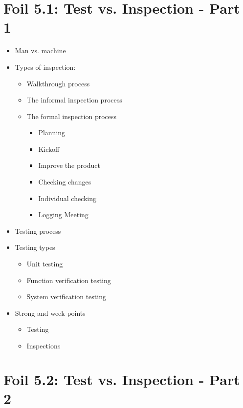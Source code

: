 
	\section{Foil 5.1: Test vs. Inspection - Part 1}

		\begin{itemize}
			\item Man vs. machine
			\item Types of inspection:
				\begin{itemize}
					\item Walkthrough process
					\item The informal inspection process
					\item The formal inspection process
						\begin{itemize}
							\item Planning
							\item Kickoff
							\item Improve the product
							\item Checking changes
							\item Individual checking
							\item Logging Meeting
						\end{itemize}
				\end{itemize}
			\item Testing process
			\item Testing types
				\begin{itemize}
					\item Unit testing
					\item Function verification testing
					\item System verification testing
				\end{itemize}
			\item Strong and week points
			\begin{itemize}
				\item Testing 
				\item Inspections
			\end{itemize}
		\end{itemize}

	\section{Foil 5.2: Test vs. Inspection - Part 2}

